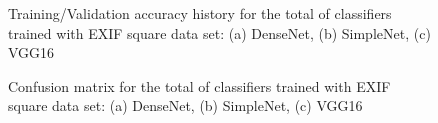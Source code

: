 \begin{figure}[ht!]
    \centering  
    \caption{Training/Validation accuracy history for the total of classifiers trained with EXIF square data set: (a) DenseNet, (b) SimpleNet, (c) VGG16}
    \label{c5:exif_training_history}
\end{figure}

\begin{figure}[ht!]
    \centering  
    \caption{Confusion matrix for the total of classifiers trained with EXIF square data set: (a) DenseNet, (b) SimpleNet, (c) VGG16}
    \label{c5:exif_cm}
\end{figure}

